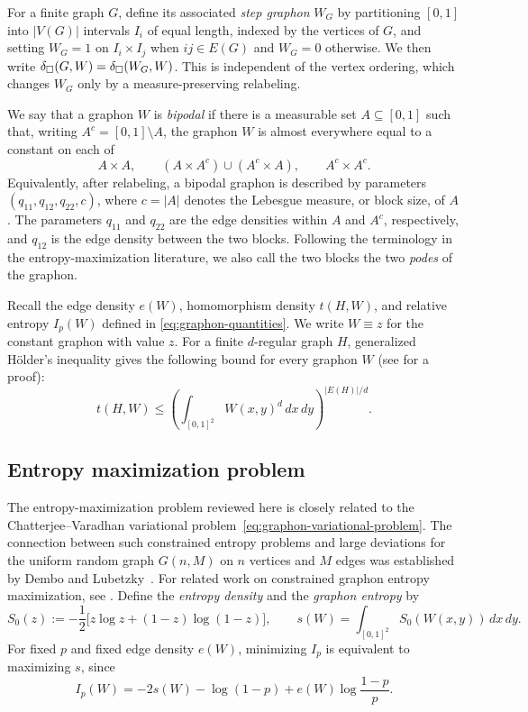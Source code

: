For a finite graph $G$, define its associated \emph{step graphon} $W_G$ by
partitioning $[0,1]$ into $|V(G)|$ intervals $I_i$ of equal length,
indexed by the vertices of $G$, and setting $W_G=1$ on $I_i\times I_j$
when $ij\in E(G)$ and $W_G=0$ otherwise.
We then write $\delta_\square(G,W)=\delta_\square(W_G,W)$.
This is independent of the vertex ordering, which changes $W_G$ only
by a measure-preserving relabeling.

We say that a graphon $W$ is \emph{bipodal} if there is a measurable set
$A\subseteq[0,1]$ such that, writing $A^c=[0,1]\setminus A$, the graphon $W$
is almost everywhere equal to a constant on each of
\[
  A\times A,
  \qquad
  (A\times A^c)\cup(A^c\times A),
  \qquad
  A^c\times A^c.
\]
Equivalently, after relabeling, a bipodal graphon is described by parameters
$(q_{11},q_{12},q_{22},c)$, where $c=|A|$ denotes the Lebesgue measure, or block
size, of $A$.  The parameters $q_{11}$ and $q_{22}$ are the edge densities
within $A$ and $A^c$, respectively, and $q_{12}$ is the edge density between
the two blocks.  Following the terminology in the entropy-maximization
literature, we also call the two blocks the two \emph{podes} of the graphon.

Recall the edge density $e(W)$, homomorphism density $t(H,W)$, and relative
entropy $I_p(W)$ defined in \eqref{eq:graphon-quantities}.
We write $W\equiv z$ for the constant graphon with value $z$.
For a finite $d$-regular graph $H$, generalized H\"older's inequality gives
the following bound for every graphon $W$ (see \cite{lubetzky2015large} for a proof):
\begin{equation}\label{eq:generalized-holder}
  t(H,W)\le
  \left(\int_{[0,1]^2}W(x,y)^d\,dx\,dy\right)^{|E(H)|/d}.
\end{equation}

\subsection{Entropy maximization problem}
The entropy-maximization problem reviewed here is closely related to the
Chatterjee--Varadhan variational problem~\eqref{eq:graphon-variational-problem}.
The connection between such constrained entropy problems and large
deviations for the uniform random graph $G(n,M)$ on $n$ vertices and $M$ edges
was established by Dembo and Lubetzky~\cite{DemboLubetzky2018}.
For related work on constrained graphon entropy maximization, see
\cite{KenyonRadinRenSadun2017,KenyonRadinRenSadun2017b,NeemanRadinSadun2023}.
Define the \emph{entropy density} and the \emph{graphon entropy} by
\begin{equation}\label{eq:graphon-entropy}
  S_0(z):=-\frac12\bigl[z\log z+(1-z)\log(1-z)\bigr], \qquad
  s(W)=\int_{[0,1]^2}S_0(W(x,y))\,dx\,dy.
\end{equation}
For fixed $p$ and fixed edge density $e(W)$, minimizing $I_p$ is equivalent to
maximizing $s$, since
\begin{equation}\label{eq:relative-entropy-identity}
  I_p(W)=-2s(W)-\log(1-p)+e(W)\log\frac{1-p}{p}.
\end{equation}

